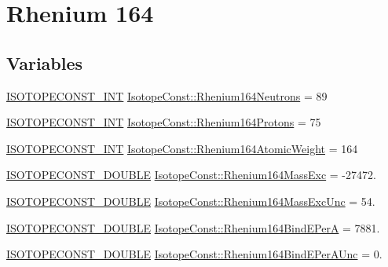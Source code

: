\hypertarget{group___isotope_const-_rhenium-_re164}{}\section{Rhenium 164}
\label{group___isotope_const-_rhenium-_re164}
\subsection*{Variables}
\begin{DoxyCompactItemize}
\item 
\mbox{\hyperlink{group___isotope_const-_macros_ga5f18360b3e99483a35c32d789e62621c}{I\+S\+O\+T\+O\+P\+E\+C\+O\+N\+S\+T\+\_\+\+I\+NT}} \mbox{\hyperlink{group___isotope_const-_rhenium-_re164_ga7f084629e8f84794202bc589e6711631}{Isotope\+Const\+::\+Rhenium164\+Neutrons}} = 89
\item 
\mbox{\hyperlink{group___isotope_const-_macros_ga5f18360b3e99483a35c32d789e62621c}{I\+S\+O\+T\+O\+P\+E\+C\+O\+N\+S\+T\+\_\+\+I\+NT}} \mbox{\hyperlink{group___isotope_const-_rhenium-_re164_ga8800765e88ab322ddcf1994c94bffe80}{Isotope\+Const\+::\+Rhenium164\+Protons}} = 75
\item 
\mbox{\hyperlink{group___isotope_const-_macros_ga5f18360b3e99483a35c32d789e62621c}{I\+S\+O\+T\+O\+P\+E\+C\+O\+N\+S\+T\+\_\+\+I\+NT}} \mbox{\hyperlink{group___isotope_const-_rhenium-_re164_gaf48961780d2b226c9d1f8c469865105e}{Isotope\+Const\+::\+Rhenium164\+Atomic\+Weight}} = 164
\item 
\mbox{\hyperlink{group___isotope_const-_macros_ga8f45a7272ce02c0b4c65c44636ed719a}{I\+S\+O\+T\+O\+P\+E\+C\+O\+N\+S\+T\+\_\+\+D\+O\+U\+B\+LE}} \mbox{\hyperlink{group___isotope_const-_rhenium-_re164_ga897f29a98c923f32edcc6fce78750b98}{Isotope\+Const\+::\+Rhenium164\+Mass\+Exc}} = -\/27472.
\item 
\mbox{\hyperlink{group___isotope_const-_macros_ga8f45a7272ce02c0b4c65c44636ed719a}{I\+S\+O\+T\+O\+P\+E\+C\+O\+N\+S\+T\+\_\+\+D\+O\+U\+B\+LE}} \mbox{\hyperlink{group___isotope_const-_rhenium-_re164_ga1843452d328643112ba47e34e53964c8}{Isotope\+Const\+::\+Rhenium164\+Mass\+Exc\+Unc}} = 54.
\item 
\mbox{\hyperlink{group___isotope_const-_macros_ga8f45a7272ce02c0b4c65c44636ed719a}{I\+S\+O\+T\+O\+P\+E\+C\+O\+N\+S\+T\+\_\+\+D\+O\+U\+B\+LE}} \mbox{\hyperlink{group___isotope_const-_rhenium-_re164_ga1c548f6bc469b4ee1c49129253571e97}{Isotope\+Const\+::\+Rhenium164\+Bind\+E\+PerA}} = 7881.
\item 
\mbox{\hyperlink{group___isotope_const-_macros_ga8f45a7272ce02c0b4c65c44636ed719a}{I\+S\+O\+T\+O\+P\+E\+C\+O\+N\+S\+T\+\_\+\+D\+O\+U\+B\+LE}} \mbox{\hyperlink{group___isotope_const-_rhenium-_re164_ga0d4dd73d083e2e87701817bc3680cc59}{Isotope\+Const\+::\+Rhenium164\+Bind\+E\+Per\+A\+Unc}} = 0.

\end{DoxyCompactItemize}
